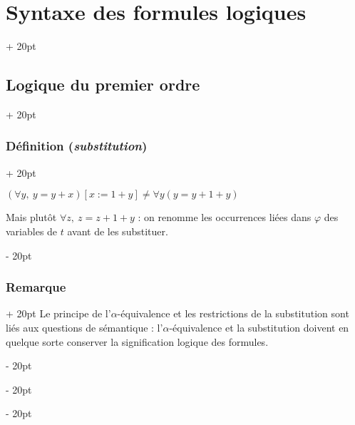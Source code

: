 \documentclass[a4paper, 12pt, twoside]{article}
\newcommand{\ind}[1][20pt]{\advance\leftskip + #1}
\newcommand{\deind}[1][20pt]{\advance\leftskip - #1}
\newenvironment{indt}[2][20pt]{#2 \par \ind[#1]}{\par \deind} %
\begin{document}
\begin{indt}{\section{Syntaxe des formules logiques}}
\begin{indt}{\subsection{Logique du premier ordre}}
\begin{indt}{\subsubsection{Définition (\textit{substitution})}}
                \vspace{12pt}
                
                $(\forall y,\ y = y + x)[x := 1 + y] \neq \forall y (y = y + 1 + y)$
                
                Mais plutôt $\forall z,\ z = z + 1 + y$ : on renomme les occurrences liées dans $\varphi$ des variables de $t$ avant de les substituer.
            \end{indt}
            
            \vspace{12pt}
            
            \begin{indt}{\subsubsection{Remarque}}
                Le principe de l'$\alpha$-équivalence et les restrictions de la substitution sont liés aux questions de sémantique : l'$\alpha$-équivalence et la substitution doivent en quelque sorte conserver la signification logique des formules.
            \end{indt}
        \end{indt}
        
    \end{indt}
    
    \vspace{12pt}
    
\end{document}

